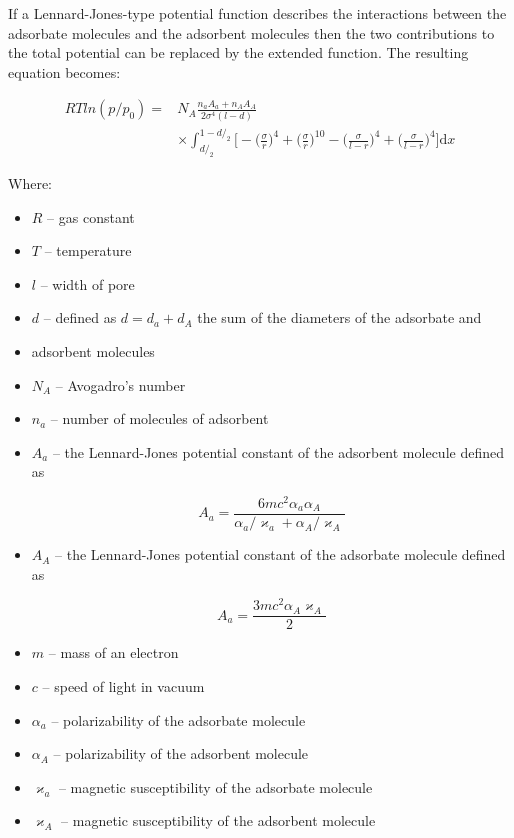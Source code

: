 If a Lennard-Jones-type potential function describes the interactions between the
adsorbate molecules and the adsorbent molecules then the two contributions to the
total potential can be replaced by the extended function. The resulting equation becomes:

\begin{align}
    RTln(p/p_0) =   & N_A\frac{n_a A_a + n_A A_A}{2 \sigma^{4}(l-d)} \\
                    & \times \int_{d/_2}^{1-d/_2}
                        \Big[
                        - \Big(\frac{\sigma}{r}\Big)^{4}
                        + \Big(\frac{\sigma}{r}\Big)^{10}
                        - \Big(\frac{\sigma}{l-r}\Big)^{4}
                        + \Big(\frac{\sigma}{l-r}\Big)^{4}
                        \Big] \mathrm{d}x
\end{align}

Where:

\begin{itemize}
    
    \item \(R\) -- gas constant
    \item \(T\) -- temperature
    \item \(l\) -- width of pore
    \item \(d\) -- defined as \(d=d_a+d_A\) the sum of the diameters of the adsorbate and
    \item adsorbent molecules
    \item \(N_A\) -- Avogadro's number
    \item \(n_a\) -- number of molecules of adsorbent
    \item \(A_a\) -- the Lennard-Jones potential constant of the adsorbent molecule defined as
    
        \begin{equation}
            A_a = \frac{6mc^2\alpha_a\alpha_A}{\alpha_a/\varkappa_a + \alpha_A/\varkappa_A}
        \end{equation}
        
    \item \(A_A\) -- the Lennard-Jones potential constant of the adsorbate molecule defined as
    
    \begin{equation}
            A_a = \frac{3mc^2\alpha_A\varkappa_A}{2}
    \end{equation}
        
    \item \(m\) -- mass of an electron
    \item \(c\) -- speed of light in vacuum
    \item \(\alpha_a\) -- polarizability of the adsorbate molecule
    \item \(\alpha_A\) -- polarizability of the adsorbent molecule
    \item \(\varkappa_a\) -- magnetic susceptibility of the adsorbate molecule
    \item \(\varkappa_A\) -- magnetic susceptibility of the adsorbent molecule
    
\end{itemize}

